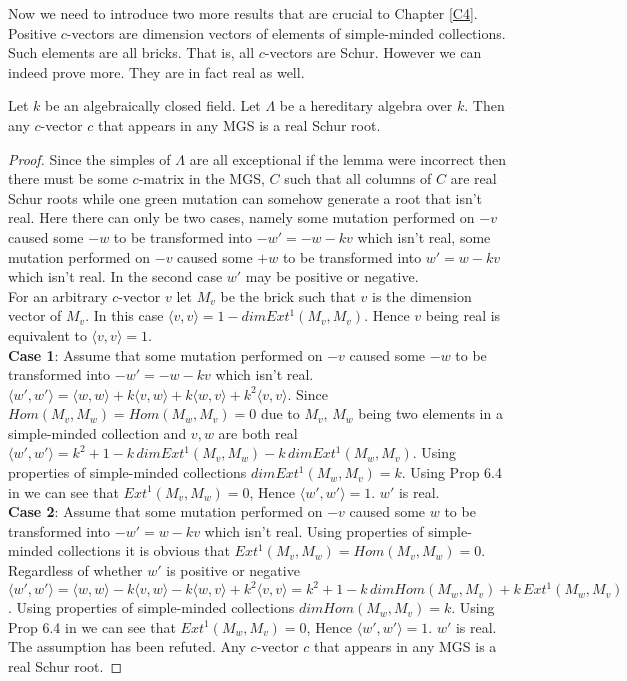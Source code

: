 \indent Now we need to introduce two more results that are crucial to Chapter \ref{C4}. Positive $c$-vectors are dimension vectors of elements of simple-minded collections. Such elements are all bricks. That is, all $c$-vectors are Schur. However we can indeed prove more. They are in fact real as well.\\
\begin{lemma}
Let $k$ be an algebraically closed field. Let $\Lambda$ be a hereditary algebra over $k$. Then any $c$-vector $c$ that appears in any MGS is a real Schur root.
\end{lemma}
\begin{proof}
\indent Since the simples of $\Lambda$ are all exceptional if the lemma were incorrect then there must be some $c$-matrix in the MGS, $C$ such that all columns of $C$ are real Schur roots while one green mutation can somehow generate a root that isn't real. Here there can only be two cases, namely some mutation performed on $-v$ caused some $-w$ to be transformed into $-w'=-w-kv$ which isn't real, some mutation performed on $-v$ caused some $+w$ to be transformed into $w'=w-kv$ which isn't real. In the second case $w'$ may be positive or negative.\\
\indent For an arbitrary $c$-vector $v$ let $M_v$ be the brick such that $v$ is the dimension vector of $M_v$. In this case $\langle v,v\rangle=1-dim Ext^1(M_v,M_v)$. Hence $v$ being real is equivalent to $\langle v,v\rangle=1$.\\
\indent \textbf{Case 1}: Assume that some mutation performed on $-v$ caused some $-w$ to be transformed into $-w'=-w-kv$ which isn't real. $\langle w', w'\rangle = \langle w, w\rangle + k\langle v,w\rangle + k\langle w,v\rangle + k^2\langle v,v\rangle$. Since $Hom(M_v, M_w) = Hom(M_w, M_v) = 0$ due to $M_v$, $M_w$ being two elements in a simple-minded collection and $v, w$ are both real  $\langle w', w'\rangle = k^2+1-k\, dim Ext^1(M_v, M_w) - k\, dim Ext^1(M_w, M_v)$. Using properties of simple-minded collections $dim Ext^1(M_w, M_v)  = k$. Using Prop 6.4 in \cite{KQ15} we can see that $Ext^1(M_v, M_w)  = 0$, Hence $\langle w', w'\rangle = 1$. $w'$ is real.\\
\indent \textbf{Case 2}: Assume that some mutation performed on $-v$ caused some $w$ to be transformed into $-w'=w-kv$ which isn't real. Using properties of simple-minded collections it is obvious that $Ext^1(M_v, M_w) = Hom(M_v, M_w) = 0$. Regardless of whether $w'$ is positive or negative $\langle w', w'\rangle = \langle w, w\rangle - k\langle v,w\rangle - k\langle w,v\rangle + k^2\langle v,v\rangle = k^2+1 -k\,dim Hom(M_w, M_v) + k\,Ext^1(M_w, M_v)$. Using properties of simple-minded collections $dim Hom(M_w, M_v)  = k$. Using Prop 6.4 in \cite{KQ15} we can see that $Ext^1(M_w, M_v)  = 0$, Hence $\langle w', w'\rangle = 1$. $w'$ is real.\\
\indent The assumption has been refuted. Any $c$-vector $c$ that appears in any MGS is a real Schur root.
\end{proof}
